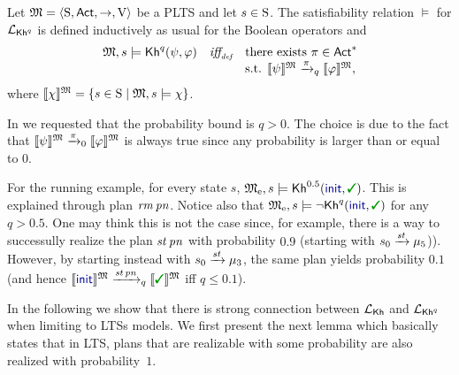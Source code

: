 \begin{definition}\label{def:semantics:PKh}
  Let $\model = \tup{\S,\Act,\ra,\V}$ be a PLTS and let $s\in\S$.  The
  satisfiability relation $\models$ for $\PKh$ is defined inductively 
  as usual for the Boolean operators and
  \[
  \begin{array}{l@{\ \ \ }c@{\ \ \  }l}
    \model, s \models \kh^q(\psi,\varphi) & \iffdef & \text{there exists } \plan \in \Act^*  \\
    & & \text{s.t. } \truthset{\model}{\psi} \reach{\plan}_q \truthset{\model}{\varphi}, 
  \end{array}
  \]
  where $\truthset{\model}{\chi} = \csetsc{s\in\S}{\model,s\models\chi}$.
\end{definition}

In  we requested that the probability bound is
$q>0$.  The choice is due to the fact that $\truthset{\model}{\psi}
\reach{\plan}_0 \truthset{\model}{\varphi}$ is always true since any
probability is larger than or equal to $0$.

\begin{example}
  For the running example, for every state $s$,
  $\modelex, s \models \kh^{0.5}(\init,\goal)$.
  This is explained through plan $\ramp\,\panic$.
  Notice also that $\modelex, s \models \neg \kh^q(\init,\goal)$ for
  any $q>0.5$. One may think this is not the case since, for example,
  there is a way to successully realize the plan $\stairs\,\panic$
  with probability $0.9$ (starting with $s_0\reach{\stairs}\mu_5$)).
  However, by starting instead with $s_0\reach{\stairs}\mu_3$, the
  same plan yields probability $0.1$ (and hence
  $\truthset{\model}{\init}\reach{\stairs\,\panic}_q\truthset{\model}{\goal}$
  iff $q\leq 0.1$).
\end{example}

In the following we show that there is strong connection between
$\Khlogic$ and $\PKh$ when limiting to LTSs models. We first present
the next lemma which basically states that in LTS, plans that are
realizable with some probability are also realized with
probability~$1$.

